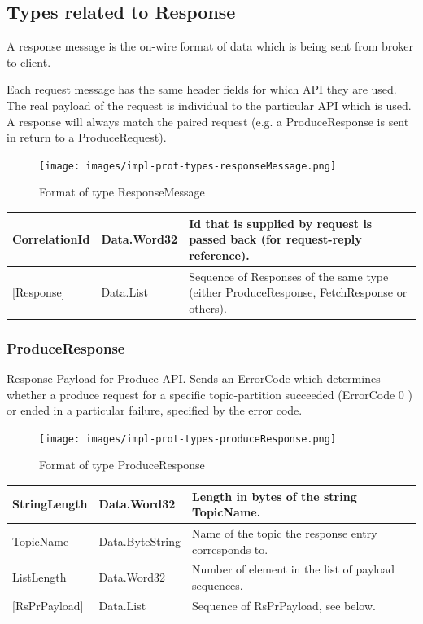 \subsection{Types related to Response}
A response message is the on-wire format of data which is being sent from broker to
client.

Each request message has the same header fields for which API they are used. 
The real payload of the request is individual to the particular API which is
used. A response will always match the paired request (e.g. a ProduceResponse is
sent in return to a ProduceRequest).

\begin{figure}[H]
    \centering
    \texttt{[image: images/impl-prot-types-responseMessage.png]}
    \caption{Format of type ResponseMessage}
    \label{fig:impl-prot-types-responseMessage}
\end{figure}

\begin{table}[H]
\centering
\begin{tabular}{ l  l  p{8.5cm} }
\hline
CorrelationId  & Data.Word32 & Id that is supplied by request is passed back
(for request-reply reference).              \\ \hline
{[}Response{]} & Data.List   & Sequence of Responses of the same type (either
ProduceResponse, FetchResponse or others). \\ \hline
\end{tabular}
\end{table}


\subsubsection{ProduceResponse}
Response Payload for Produce API. Sends an ErrorCode which determines whether a
produce request for a specific topic-partition succeeded (ErrorCode 0 ) or ended
in a particular failure, specified by the error code.

\begin{figure}[H]
    \centering
    \texttt{[image: images/impl-prot-types-produceResponse.png]}
    \caption{Format of type ProduceResponse}
    \label{fig:impl-prot-types-produceResponse}
\end{figure}

\begin{table}[H]
\centering
\begin{tabular}{ l  l  p{8cm} }
\hline
StringLength      & Data.Word32     & Length in bytes of the string TopicName. \\ \hline
TopicName         & Data.ByteString & Name of the topic the response entry corresponds to.\\ \hline
ListLength        & Data.Word32     & Number of element in the list of payload
sequences.\\ \hline
{[}RsPrPayload{]} & Data.List       & Sequence of RsPrPayload, see below.
\\ \hline
\end{tabular}
\end{table}

